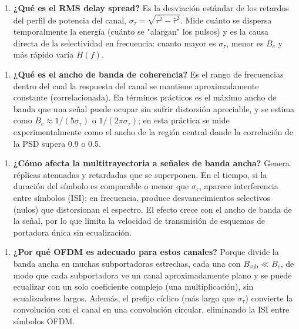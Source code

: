 \documentclass[11pt,a4paper]{article}
\begin{document}
\begin{enumerate}
  \item \textbf{¿Qué es el RMS delay spread?} Es la desviación estándar de los retardos del perfil de potencia del canal, $\sigma_\tau=\sqrt{\overline{\tau^2}-\bar{\tau}^2}$. Mide cuánto se dispersa temporalmente la energía (cuánto se "alargan" los pulsos) y es la causa directa de la selectividad en frecuencia: cuanto mayor es $\sigma_\tau$, menor es $B_c$ y más rápido varía $H(f)$.
\end{enumerate}

\begin{enumerate}
  \item \textbf{¿Qué es el ancho de banda de coherencia?} Es el rango de frecuencias dentro del cual la respuesta del canal se mantiene aproximadamente constante (correlacionada). En términos prácticos es el máximo ancho de banda que una señal puede ocupar sin sufrir distorsión apreciable, y se estima como $B_c\approx 1/(5\sigma_\tau)$ o $1/(2\pi\sigma_\tau)$; en esta práctica se mide experimentalmente como el ancho de la región central donde la correlación de la PSD supera 0.9 o 0.5.
\end{enumerate}

\begin{enumerate}
  \item \textbf{¿Cómo afecta la multitrayectoria a señales de banda ancha?} Genera réplicas atenuadas y retardadas que se superponen. En el tiempo, si la duración del símbolo es comparable o menor que $\sigma_\tau$, aparece interferencia entre símbolos (ISI); en frecuencia, produce desvanecimientos selectivos (nulos) que distorsionan el espectro. El efecto crece con el ancho de banda de la señal, por lo que limita la velocidad de transmisión de esquemas de portadora única sin ecualización.
\end{enumerate}

\begin{enumerate}
  \item \textbf{¿Por qué OFDM es adecuado para estos canales?} Porque divide la banda ancha en muchas subportadoras estrechas, cada una con $B_{\text{sub}}\ll B_c$, de modo que cada subportadora ve un canal aproximadamente plano y se puede ecualizar con un solo coeficiente complejo (una multiplicación), sin ecualizadores largos. Además, el prefijo cíclico (más largo que $\sigma_\tau$) convierte la convolución con el canal en una convolución circular, eliminando la ISI entre símbolos OFDM.
\end{enumerate}
\end{document}
